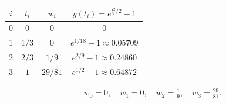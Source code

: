 \documentclass[12pt,letterpaper]{article}
\begin{document}
\begin{center}
\begin{tabular}{cccc}
\toprule
$i$ & $t_i$ & $w_i$ & $y(t_i) = e^{t_i^2/2} - 1$ \\
\midrule
0 & $0$       & $0$           & $0$ \\
1 & $1/3$     & $0$           & $e^{1/18} - 1 \approx 0.05709$ \\
2 & $2/3$     & $1/9$         & $e^{2/9} - 1 \approx 0.24860$ \\
3 & $1$       & $29/81$       & $e^{1/2} - 1 \approx 0.64872$ \\
\bottomrule
\end{tabular}
\end{center}

\[
\boxed{w_0 = 0, \quad w_1 = 0, \quad w_2 = \tfrac{1}{9}, \quad w_3 = \tfrac{29}{81}.}
\]

\par
\end{document}
